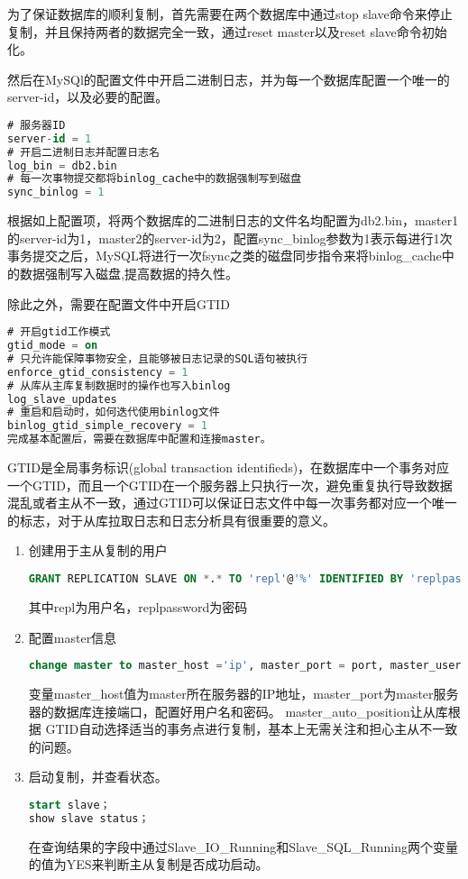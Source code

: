 为了保证数据库的顺利复制，首先需要在两个数据库中通过stop slave命令来停止复制，并且保持两者的数据完全一致，通过reset master以及reset slave命令初始化。

然后在MySQl的配置文件中开启二进制日志，并为每一个数据库配置一个唯一的server-id，以及必要的配置。
\begin{lstlisting}[language=sql,numbers=none]
# 服务器ID
server-id = 1
# 开启二进制日志并配置日志名
log_bin = db2.bin
# 每一次事物提交都将binlog_cache中的数据强制写到磁盘
sync_binlog = 1
\end{lstlisting}
根据如上配置项，将两个数据库的二进制日志的文件名均配置为db2.bin，master1的server-id为1，master2的server-id为2，配置sync\_binlog参数为1表示每进行1次事务提交之后，MySQL将进行一次fsync之类的磁盘同步指令来将binlog\_cache中的数据强制写入磁盘,提高数据的持久性。

除此之外，需要在配置文件中开启GTID
\begin{lstlisting}[language=sql,numbers=none]
# 开启gtid工作模式
gtid_mode = on
# 只允许能保障事物安全，且能够被日志记录的SQL语句被执行
enforce_gtid_consistency = 1
# 从库从主库复制数据时的操作也写入binlog
log_slave_updates
# 重启和启动时，如何迭代使用binlog文件
binlog_gtid_simple_recovery = 1
完成基本配置后，需要在数据库中配置和连接master。
\end{lstlisting}
GTID是全局事务标识(global transaction identifieds)，在数据库中一个事务对应一个GTID，而且一个GTID在一个服务器上只执行一次，避免重复执行导致数据混乱或者主从不一致，通过GTID可以保证日志文件中每一次事务都对应一个唯一的标志，对于从库拉取日志和日志分析具有很重要的意义。
\begin{enumerate}
\item 创建用于主从复制的用户
\begin{lstlisting}[language=sql,numbers=none]
GRANT REPLICATION SLAVE ON *.* TO 'repl'@'%' IDENTIFIED BY 'replpassword';
\end{lstlisting}
其中repl为用户名，replpassword为密码
\item 配置master信息
\begin{lstlisting}[language=sql,numbers=none]
change master to master_host ='ip', master_port = port, master_user = 'repl', master_password = 'replpassword', master_auto_position =1;
\end{lstlisting}
变量master\_host值为master所在服务器的IP地址，master\_port为master服务器的数据库连接端口，配置好用户名和密码。
master\_auto\_position让从库根据 GTID自动选择适当的事务点进行复制，基本上无需关注和担心主从不一致的问题。
\item 启动复制，并查看状态。
\begin{lstlisting}[language=sql,numbers=none]
start slave；
show slave status；
\end{lstlisting}
在查询结果的字段中通过Slave\_IO\_Running和Slave\_SQL\_Running两个变量的值为YES来判断主从复制是否成功启动。
\end{enumerate}

